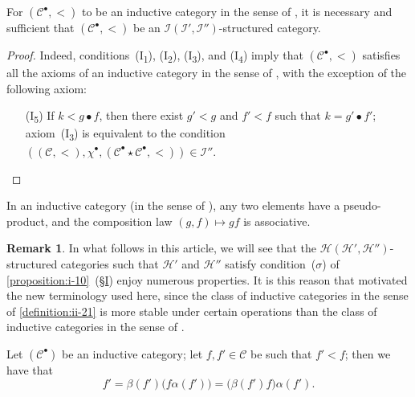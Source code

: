 \documentclass[a4paper,fleqn]{article}
\theoremstyle{plain}
\newenvironment{proposition}[1]
  {\renewcommand\theinnerproposition{#1}\innerproposition}
  {\endinnerproposition}
\newenvironment{corollary}[1]
  {\renewcommand\theinnercorollary{#1}\innercorollary}
  {\endinnercorollary}
\theoremstyle{definition}
\newtheorem*{remark}{Remark}
\newcommand{\CC}{\mathcal{C}}
\newcommand{\HH}{\mathcal{H}}
\newcommand{\II}{\mathcal{I}}
\begin{document}
\begin{corollary}{1}
  For $(\CC^\bullet,<)$ to be an inductive category in the sense of \cite{3c}, it is necessary and sufficient that $(\CC^\bullet,<)$ be an $\II(\II',\II'')$-structured category.
\end{corollary}

\begin{proof}
  Indeed, conditions~(I\textsubscript{1}), (I\textsubscript{2}), (I\textquotesingle\!\textsubscript{3}), and (I\textquotesingle\!\textsubscript{4}) imply that $(\CC^\bullet,<)$ satisfies all the axioms of an inductive category in the sense of \cite{3c}, with the exception of the following axiom:
  \begin{enumerate}
    \item[\normalfont(I\textquotesingle\!\textsubscript{5})]
      If $k<g\bullet f$, then there exist $g'<g$ and $f'<f$ such that $k=g'\bullet f'$;
      axiom~(I\textquotesingle\!\textsubscript{3}) is equivalent to the condition $((\CC,<),\chi^\bullet,(\CC^\bullet\star\CC^\bullet,<))\in\II''$.
      \qedhere
  \end{enumerate}
\end{proof}

\begin{corollary}{2}
  In an inductive category (in the sense of \cite{3c}), any two elements have a pseudo-product, and the composition law $(g,f)\mapsto gf$ is associative.
\end{corollary}

\begin{remark}
  In what follows in this article, we will see that the $\HH(\HH',\HH'')$-structured categories such that $\HH'$ and $\HH''$ satisfy condition~($\sigma$) of \cref{proposition:i-10}~(\hyperref[section:i]{§I}) enjoy numerous properties.
  It is this reason that motivated the new terminology used here, since the class of inductive categories in the sense of \cref{definition:ii-21} is more stable under certain operations than the class of inductive categories in the sense of \cite{3c}.
\end{remark}

\begin{proposition}{24}
\label{proposition:ii-24}
  Let $(\CC^\bullet)$ be an inductive category;
  let $f,f'\in\CC$ be such that $f'<f$;
  then we have that
  \[
    f'
    = \beta(f')\big(f\alpha(f')\big)
    = \big(\beta(f')f)\alpha(f').
  \]
\end{proposition}
\end{document}
